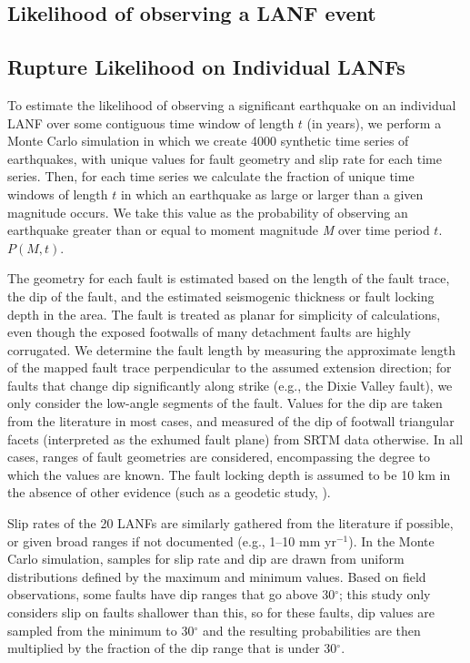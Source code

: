 \documentclass[twocolumn,grl]{AGUTeX}
\begin{document}
\begin{article}
\section{Likelihood of observing a LANF event}
\subsection{Rupture Likelihood on Individual LANFs}
To estimate the likelihood of observing a significant earthquake on an
individual LANF over some contiguous time window of length $t$ (in
years), we perform a Monte Carlo simulation in which we create 4000
synthetic time series of earthquakes, with unique values for fault
geometry and slip rate for each time series. Then, for each time
series we calculate the fraction of unique time windows of length $t$
in which an earthquake as large or larger than a given magnitude
occurs.  We take this value as the probability of observing an
earthquake greater than or equal to moment magnitude \emph{M} over
time period $t$.%
$P(M,t)$.

The geometry for each fault is estimated based on the length of the
fault trace, the dip of the fault, and the estimated seismogenic
thickness or fault locking depth in the area.  The fault is treated as
planar for simplicity of calculations, even though the exposed
footwalls of many detachment faults are highly corrugated.  We
determine the fault length by measuring the approximate length of the
mapped fault trace perpendicular to the assumed extension direction;
for faults that change dip significantly along strike (e.g., the Dixie
Valley fault), we only consider the low-angle segments of the fault.
Values for the dip are taken from the literature in most cases, and
measured of the dip of footwall triangular facets (interpreted as the exhumed
fault plane) from SRTM data otherwise. In all cases, ranges of fault
geometries are considered, encompassing the degree to which the values are 
known. The fault locking depth is assumed to be 10 km in the absence of other
evidence (such as a geodetic study, \citep[e.g.,][]{hreinsdottir2009altotib}).

Slip rates of the 20 LANFs are similarly gathered from the
literature if possible, or given broad ranges if not documented
(e.g., 1--10 mm yr$^{-1}$).  In the Monte Carlo simulation, samples
for slip rate and dip are drawn from uniform distributions defined
by the maximum and minimum values.  Based on field observations,
some faults have dip ranges that go above 30$^\circ$; this study
only considers slip on faults shallower than this, so for these
faults, dip values are sampled from the minimum to 30$^\circ$ and
the resulting probabilities are then multiplied by the fraction of
the dip range that is under 30$^\circ$.


\end{article}
\end{document}
